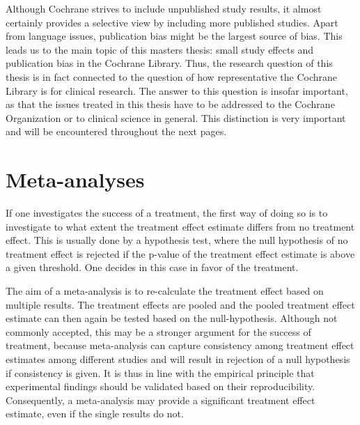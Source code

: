 \documentclass[11pt,a4paper,twoside]{book}\usepackage[]{graphicx}\usepackage[]{color}
\begin{document}
\vspace{0mm}
Although Cochrane strives to include unpublished study results, it almost certainly provides a selective view by including more published studies. Apart from language issues, publication bias might be the largest source of bias. This leads us to the main topic of this masters thesis: small study effects and publication bias in the Cochrane Library. Thus, the research question of this thesis is in fact connected to the question of how representative the Cochrane Library is for clinical research. The answer to this question is insofar important, as that the issues treated in this thesis have to be addressed to the Cochrane Organization or to clinical science in general. This distinction is very important and will be encountered throughout the next pages. 



\section{Meta-analyses}
If one investigates the success of a treatment, the first way of doing so is to investigate to what extent the treatment effect estimate differs from no treatment effect. This is usually done by a hypothesis test, where the null hypothesis of no treatment effect is rejected if the p-value of the treatment effect estimate is above a given threshold. One decides in this case in favor of the treatment. 

\vspace{0mm}
The aim of a meta-analysis is to re-calculate the treatment effect based on multiple results. The treatment effects are pooled and the pooled treatment effect estimate can then again be tested based on the null-hypothesis. Although not commonly accepted, this may be a stronger argument for the success of treatment, because meta-analysis can capture consistency among treatment effect estimates among different studies and will result in rejection of a null hypothesis if consistency is given. It is thus in line with the empirical principle that experimental findings should be validated based on their reproducibility. Consequently, a meta-analysis may provide a significant treatment effect estimate, even if the single results do not.
\end{document}
